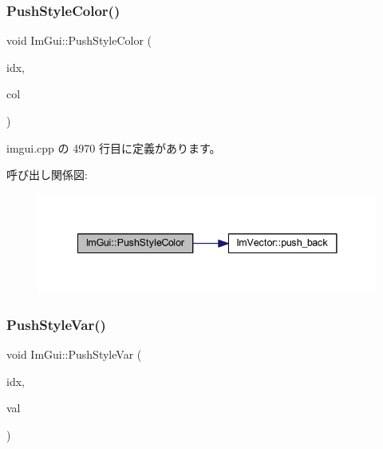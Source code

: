 \subsubsection{\texorpdfstring{Push\+Style\+Color()}{PushStyleColor()}\hspace{0.1cm}{\footnotesize\ttfamily [2/2]}}
{\footnotesize\ttfamily void Im\+Gui\+::\+Push\+Style\+Color (\begin{DoxyParamCaption}\item[{\mbox{\hyperlink{imgui_8h_a1b0467ec582e731ae6292fef726fb5fe}{Im\+Gui\+Col}}}]{idx,  }\item[{const \mbox{\hyperlink{struct_im_vec4}{Im\+Vec4}} \&}]{col }\end{DoxyParamCaption})}



 imgui.\+cpp の 4970 行目に定義があります。

呼び出し関係図\+:\nopagebreak
\begin{figure}[H]
\begin{center}
\leavevmode
\includegraphics[width=341pt]{namespace_im_gui_a5bd052ebf55015312a53739974950e7b_cgraph}
\end{center}
\end{figure}
\mbox{\label{namespace_im_gui_aab3f43009094462cf2a5eb554785949b}} 
\subsubsection{\texorpdfstring{Push\+Style\+Var()}{PushStyleVar()}\hspace{0.1cm}{\footnotesize\ttfamily [1/2]}}
{\footnotesize\ttfamily void Im\+Gui\+::\+Push\+Style\+Var (\begin{DoxyParamCaption}\item[{\mbox{\hyperlink{imgui_8h_ac919acabce24faae590e295b424874ca}{Im\+Gui\+Style\+Var}}}]{idx,  }\item[{float}]{val }\end{DoxyParamCaption})}



